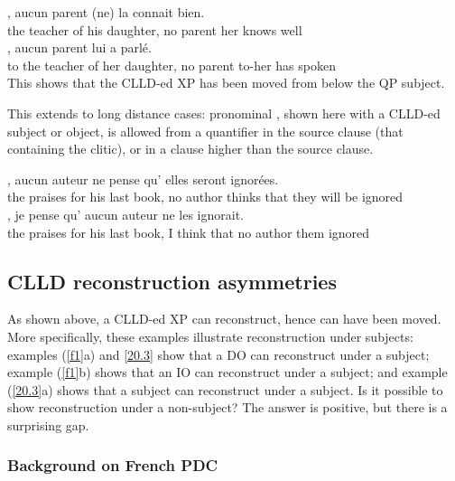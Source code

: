 \documentclass[output=paper]{langsci/langscibook}
\begin{document}
\ea \label{f1}
\ea
	,  aucun parent  (ne) la 	connait bien.\\
    {} the teacher of his daughter, no parent \hphantom{(}\Neg{} her knows well\\
\ex
	,  aucun parent 	lui 	a parl\'{e}.\\
    {} to the teacher of her daughter, no parent to-her has spoken\\
\z
\z
%
This shows that the \gls{CLLD}-ed XP has been moved from below the QP subject.

This extends to long distance cases: pronominal , shown here with
a \gls{CLLD}-ed subject or object, is allowed from a quantifier in the source
clause (that containing the clitic), or in a clause higher  than the source
clause.

\ea \label{20.3}
\ea
{},
aucun auteur ne     pense     qu'    elles  seront
ignor\'{e}es.\\
    {} the    praises       for  his    last      book,     no       author
    \Neg{}  thinks    that   they   {will be} ignored\\
\ex {},     je pense     qu'    aucun auteur ne
les  ignorait.\\
    {}  the    praises       for  his    last      book,     I  think    that
    no author \Neg{} them ignored\\
\z
\z
%
\subsection{CLLD reconstruction asymmetries}

As shown above, a \gls{CLLD}-ed XP can reconstruct, hence can have been moved.
More specifically, these examples illustrate reconstruction under subjects:
examples (\ref{f1}a) and \eqref{20.3} show that a DO can reconstruct under a
subject; example (\ref{f1}b) shows that an IO can reconstruct under a subject;
and example (\ref{20.3}a) shows that a subject can reconstruct under a subject.
Is it possible to show reconstruction under a non-subject? The answer is
positive, but there is a surprising gap.

\subsubsection{Background on French PDC}
\end{document}
